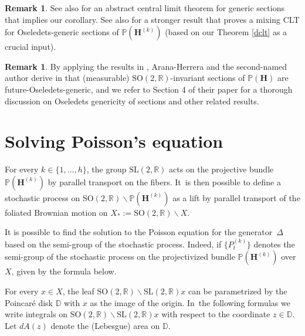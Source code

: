 \documentclass[JEP,XML,SOM,Unicode,published]{cedram}
\theoremstyle{plain}
\theoremstyle{definition}
\newtheorem{rem}[thm]{Remark}
\numberwithin{equation}{subsection}
\newcommand\bD{\mathbb{D}}
\newcommand\bP{\mathbb{P}}
\newcommand\bR{\mathbb{R}}\let\R\bR
\newcommand{\SL}{\mathrm{SL}}
\newcommand{\SO}{\mathrm{SO}}
\let\laplacian\Delta
\newcommand{\bfH}{\boldsymbol{H}}
\begin{document}
\begin{rem}
See also \cite[Th.\,3.10, 3.11, 3.21 \& 3.22]{AF24} for an abstract central limit theorem for generic sections that implies our corollary. See also \cite[Th.\,4.25]{AF24} for a stronger result that proves a mixing CLT for Oseledets-generic sections of $\bP(\bfH^{(k)})$ (based on our Theorem \ref{dclt} as a crucial input).
\end{rem}

\begin{rem}By applying the results in \cite{CE13,CF20, AAE+21}, Arana-Herrera and the second-named author derive in \cite[Th.\,4.32]{AF24} that (measurable) $\SO(2,\bR)$-invariant sections of $\bP(\bfH)$ are future-Oseledets-generic, and we refer to Section 4 of their paper for a thorough discussion on Oseledets genericity of sections and other related results.
\end{rem}

\appendix
\section{Solving Poisson's equation}\label{poisson}

For every $k\in \{1, \dots, h\}$, the group $\SL(2,\R)$ acts on the projective bundle $\bP(\bfH^{(k)})$
by parallel transport on the fibers. It~is then possible
to define a stochastic process on $ \SO(2,\R)\backslash \bP(\bfH^{(k)})$ as a lift by parallel transport of the foliated Brownian motion on $X_*:=\SO(2, \R)\backslash X$.

It is possible to find the solution to the Poisson
equation for the generator~$\laplacian$ based on the semi-group of the stochastic process. Indeed, if $\{P^{(k)}_t\}$ denotes the semi-group of the stochastic process on the projectivized bundle $\bP(\bfH^{(k)})$ over $X$, given by the formula below.

For every $x \in X$, the leaf $\SO(2,\R)\backslash \SL(2,\R) x$ can be parametrized by the Poincaré
disk $\bD$ with $x$ as the image of the origin. In~the following formulas we write integrals on $\SO(2,\R)\backslash \SL(2,\R) x$
with respect to the coordinate $z \in \bD$.
Let $dA(z)$ denote the (Lebesgue) area on $\bD$.
\end{document}
